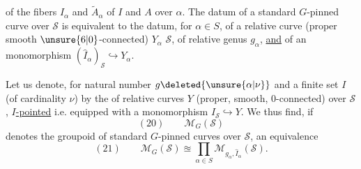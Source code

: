 of the fibers $I_\alpha$ and $\widetilde A_\alpha$ of $I$ and $A$ over $\alpha$. The datum of a standard $G$-pinned curve over $\mathcal S$ is equivalent to the datum,  for  $\alpha\in S$, of a relative curve (proper smooth  $\unsure{6|0}$-connected) $Y_\alpha$  $\mathcal S$, of relative genus $g_\alpha$, \uline{and} of an monomorphism $(\widehat I_\alpha)_{\mathcal S}\hookrightarrow Y_\alpha$.

Let us denote,  for  natural number $g\deleted{\unsure{\alpha|\nu}}$ and a finite set $I$ (of cardinality $\nu$) by
the  of relative curves $Y$ (proper, smooth, $0$-connected) over $\mathcal S$, \uline{$I$-pointed} i.e. equipped with a monomorphism $I_{\mathcal S}\hookrightarrow Y$. We thus find, if
\[
(20)\qquad\mathcal M_G(\mathcal S)
\]
denotes the groupoid of standard $G$-pinned curves over $\mathcal S$, an equivalence
\[
(21)\qquad\mathcal M_G(\mathcal S)\approxeq\prod_{\alpha\in S}\mathcal M_{g_\alpha,\widehat I_\alpha}(\mathcal S).
\]
